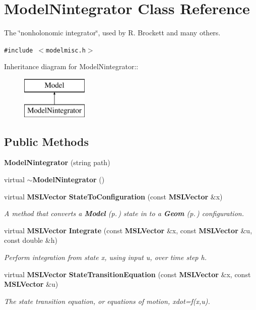 \section{Model\-Nintegrator  Class Reference}
\label{classModelNintegrator}
The \char`\"{}nonholonomic integrator\char`\"{}, used by R. Brockett and many others. 


{\tt \#include $<$modelmisc.h$>$}

Inheritance diagram for Model\-Nintegrator::\begin{figure}[H]
\begin{center}
\leavevmode
\includegraphics[height=2cm]{classModelNintegrator}
\end{center}
\end{figure}
\subsection*{Public Methods}
\begin{CompactItemize}
\item 
{\bf Model\-Nintegrator} (string path)
\item 
virtual {\bf $\sim$Model\-Nintegrator} ()
\item 
virtual {\bf MSLVector} {\bf State\-To\-Configuration} (const {\bf MSLVector} \&x)
\begin{CompactList}\small\item\em A method that converts a {\bf Model} {\rm (p.\,\pageref{classModel})} state in to a {\bf Geom} {\rm (p.\,\pageref{classGeom})} configuration.\item\end{CompactList}\item 
virtual {\bf MSLVector} {\bf Integrate} (const {\bf MSLVector} \&x, const {\bf MSLVector} \&u, const double \&h)
\begin{CompactList}\small\item\em Perform integration from state x, using input u, over time step h.\item\end{CompactList}\item 
virtual {\bf MSLVector} {\bf State\-Transition\-Equation} (const {\bf MSLVector} \&x, const {\bf MSLVector} \&u)
\begin{CompactList}\small\item\em The state transition equation, or equations of motion, xdot=f(x,u).\item\end{CompactList}\end{CompactItemize}
